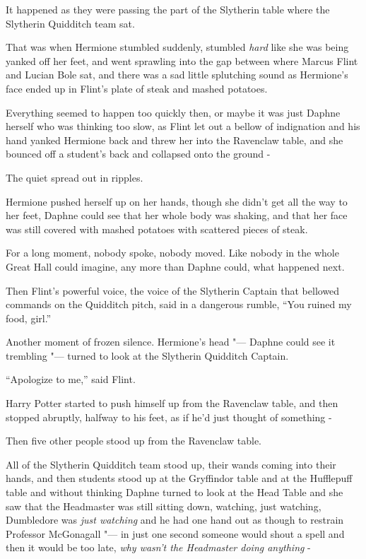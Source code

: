 It happened as they were passing the part of the Slytherin table where
the Slytherin Quidditch team sat.

That was when Hermione stumbled suddenly, stumbled \emph{hard} like she
was being yanked off her feet, and went sprawling into the gap between
where Marcus Flint and Lucian Bole sat, and there was a sad little
splutching sound as Hermione's face ended up in Flint's plate of steak
and mashed potatoes.

Everything seemed to happen too quickly then, or maybe it was just
Daphne herself who was thinking too slow, as Flint let out a bellow of
indignation and his hand yanked Hermione back and threw her into the
Ravenclaw table, and she bounced off a student's back and collapsed onto
the ground -

The quiet spread out in ripples.

Hermione pushed herself up on her hands, though she didn't get all the
way to her feet, Daphne could see that her whole body was shaking, and
that her face was still covered with mashed potatoes with scattered
pieces of steak.

For a long moment, nobody spoke, nobody moved. Like nobody in the whole
Great Hall could imagine, any more than Daphne could, what happened
next.

Then Flint's powerful voice, the voice of the Slytherin Captain that
bellowed commands on the Quidditch pitch, said in a dangerous rumble,
``You ruined my food, girl.''

Another moment of frozen silence. Hermione's head "--- Daphne could see it
trembling "--- turned to look at the Slytherin Quidditch Captain.

``Apologize to me,'' said Flint.

Harry Potter started to push himself up from the Ravenclaw table, and
then stopped abruptly, halfway to his feet, as if he'd just thought of
something -

Then five other people stood up from the Ravenclaw table.

All of the Slytherin Quidditch team stood up, their wands coming into
their hands, and then students stood up at the Gryffindor table and at
the Hufflepuff table and without thinking Daphne turned to look at the
Head Table and she saw that the Headmaster was still sitting down,
watching, just watching, Dumbledore was \emph{just watching} and he had
one hand out as though to restrain Professor McGonagall "--- in just one
second someone would shout a spell and then it would be too late,
\emph{why wasn't the Headmaster doing anything} -

